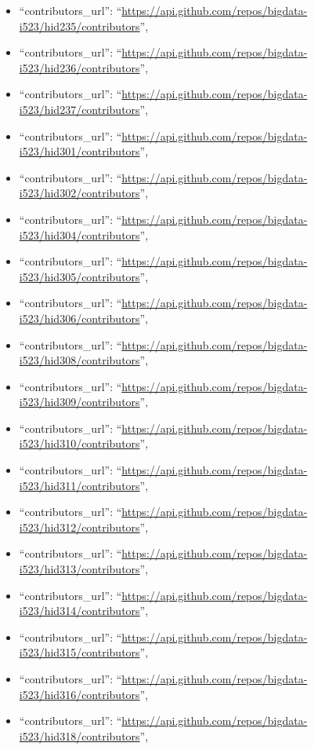\begin{itemize}
\item
  ``contributors\_url'':
  ``\url{https://api.github.com/repos/bigdata-i523/hid235/contributors}'',
\item
  ``contributors\_url'':
  ``\url{https://api.github.com/repos/bigdata-i523/hid236/contributors}'',
\item
  ``contributors\_url'':
  ``\url{https://api.github.com/repos/bigdata-i523/hid237/contributors}'',
\item
  ``contributors\_url'':
  ``\url{https://api.github.com/repos/bigdata-i523/hid301/contributors}'',
\item
  ``contributors\_url'':
  ``\url{https://api.github.com/repos/bigdata-i523/hid302/contributors}'',
\item
  ``contributors\_url'':
  ``\url{https://api.github.com/repos/bigdata-i523/hid304/contributors}'',
\item
  ``contributors\_url'':
  ``\url{https://api.github.com/repos/bigdata-i523/hid305/contributors}'',
\item
  ``contributors\_url'':
  ``\url{https://api.github.com/repos/bigdata-i523/hid306/contributors}'',
\item
  ``contributors\_url'':
  ``\url{https://api.github.com/repos/bigdata-i523/hid308/contributors}'',
\item
  ``contributors\_url'':
  ``\url{https://api.github.com/repos/bigdata-i523/hid309/contributors}'',
\item
  ``contributors\_url'':
  ``\url{https://api.github.com/repos/bigdata-i523/hid310/contributors}'',
\item
  ``contributors\_url'':
  ``\url{https://api.github.com/repos/bigdata-i523/hid311/contributors}'',
\item
  ``contributors\_url'':
  ``\url{https://api.github.com/repos/bigdata-i523/hid312/contributors}'',
\item
  ``contributors\_url'':
  ``\url{https://api.github.com/repos/bigdata-i523/hid313/contributors}'',
\item
  ``contributors\_url'':
  ``\url{https://api.github.com/repos/bigdata-i523/hid314/contributors}'',
\item
  ``contributors\_url'':
  ``\url{https://api.github.com/repos/bigdata-i523/hid315/contributors}'',
\item
  ``contributors\_url'':
  ``\url{https://api.github.com/repos/bigdata-i523/hid316/contributors}'',
\item
  ``contributors\_url'':
  ``\url{https://api.github.com/repos/bigdata-i523/hid318/contributors}'',

\end{itemize}
